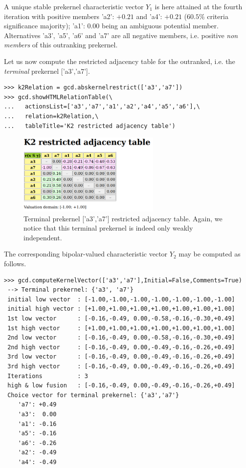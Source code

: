 A unique stable prekernel characteristic vector $Y_1$ is here attained at the fourth iteration with positive members 'a2': $+0.21$ and 'a4': $+0.21$ ($60.5\%$ criteria significance majority); 'a1': $0.00$ being an ambiguous potential member. Alternatives 'a3', 'a5', 'a6' and 'a7' are all negative members, i.e. positive \emph{non members} of this outranking prekernel.

Let us now compute the restricted adjacency table for the outranked, i.e. the \emph{terminal} prekernel ['a3','a7'].
\begin{lstlisting}
>>> k2Relation = gcd.abskernelrestrict(['a3','a7'])
>>> gcd.showHTMLRelationTable(\
...   actionsList=['a3','a7','a1','a2','a4','a5','a6'],\
...   relation=k2Relation,\
...   tableTitle='K2 restricted adjacency table')
\end{lstlisting}
\begin{figure}[h]
\sidecaption
\includegraphics[width=7cm]{Figures/k2restricted.png}
\caption{Terminal prekernel ['a3','a7'] restricted adjacency table. Again, we notice that this terminal prekernel is indeed only weakly independent.}
\label{fig:17.10}       %
\end{figure}

The corresponding bipolar-valued characteristic vector $Y_2$ may be computed as follows.
\begin{lstlisting}
>>> gcd.computeKernelVector(['a3','a7'],Initial=False,Comments=True)
 --> Terminal prekernel: {'a3', 'a7'}
 initial low vector  : [-1.00,-1.00,-1.00,-1.00,-1.00,-1.00,-1.00]
 initial high vector : [+1.00,+1.00,+1.00,+1.00,+1.00,+1.00,+1.00]
 1st low vector      : [-0.16,-0.49, 0.00,-0.58,-0.16,-0.30,+0.49]
 1st high vector     : [+1.00,+1.00,+1.00,+1.00,+1.00,+1.00,+1.00]
 2nd low vector      : [-0.16,-0.49, 0.00,-0.58,-0.16,-0.30,+0.49]
 2nd high vector     : [-0.16,-0.49, 0.00,-0.49,-0.16,-0.26,+0.49]
 3rd low vector      : [-0.16,-0.49, 0.00,-0.49,-0.16,-0.26,+0.49]
 3rd high vector     : [-0.16,-0.49, 0.00,-0.49,-0.16,-0.26,+0.49]
 Iterations          : 3
 high & low fusion   : [-0.16,-0.49, 0.00,-0.49,-0.16,-0.26,+0.49]
 Choice vector for terminal prekernel: {'a3','a7'}
    'a7': +0.49
    'a3':  0.00
    'a1': -0.16
    'a5': -0.16
    'a6': -0.26
    'a2': -0.49
    'a4': -0.49
\end{lstlisting}

